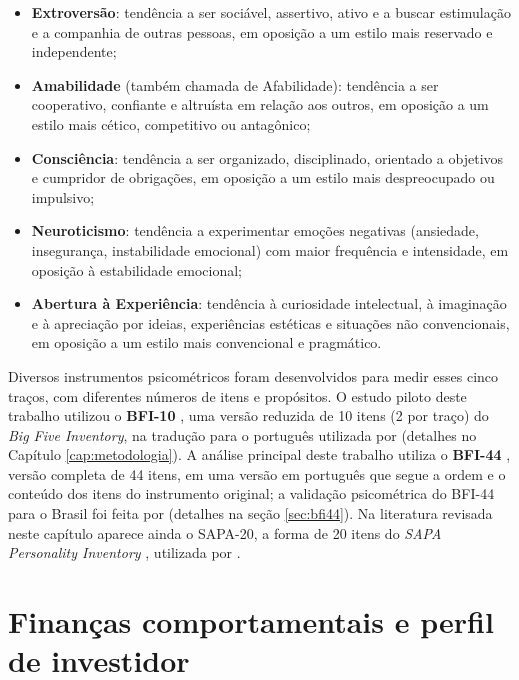 \begin{itemize}
    \item \textbf{Extroversão}: tendência a ser sociável, assertivo,
    ativo e a buscar estimulação e a companhia de outras pessoas, em
    oposição a um estilo mais reservado e independente;
    \item \textbf{Amabilidade} (também chamada de Afabilidade): tendência
    a ser cooperativo, confiante e altruísta em relação aos outros, em
    oposição a um estilo mais cético, competitivo ou antagônico;
    \item \textbf{Consciência}: tendência a ser organizado,
    disciplinado, orientado a objetivos e cumpridor de obrigações, em
    oposição a um estilo mais despreocupado ou impulsivo;
    \item \textbf{Neuroticismo}: tendência a experimentar emoções
    negativas (ansiedade, insegurança, instabilidade emocional) com maior
    frequência e intensidade, em oposição à estabilidade emocional;
    \item \textbf{Abertura à Experiência}: tendência à curiosidade
    intelectual, à imaginação e à apreciação por ideias, experiências
    estéticas e situações não convencionais, em oposição a um estilo mais
    convencional e pragmático.
\end{itemize}

Diversos instrumentos psicométricos foram desenvolvidos para medir esses
cinco traços, com diferentes números de itens e propósitos. O estudo
piloto deste trabalho utilizou o \textbf{BFI-10} \cite{rammstedtjohn2007},
uma versão reduzida de 10 itens (2 por traço) do \textit{Big Five
Inventory}, na tradução para o português utilizada por
 (detalhes no Capítulo \ref{cap:metodologia}). A
análise principal deste trabalho utiliza o \textbf{BFI-44}
\cite{johndonahuekentle1991}, versão completa de 44 itens, em uma versão em
português que segue a ordem e o conteúdo dos itens do instrumento
original; a validação psicométrica do BFI-44 para o Brasil foi feita por
 (detalhes na seção \ref{sec:bfi44}). Na
literatura revisada neste capítulo aparece ainda o SAPA-20, a forma de 20
itens do \textit{SAPA Personality Inventory} \cite{condonrevelle2015},
utilizada por .

\section{Finanças comportamentais e perfil de investidor}

